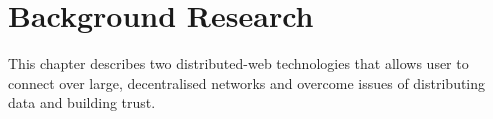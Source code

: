 \chapter{Background Research}

This chapter describes two distributed-web technologies that allows user to connect over large, decentralised networks and overcome issues of distributing data and building trust.


